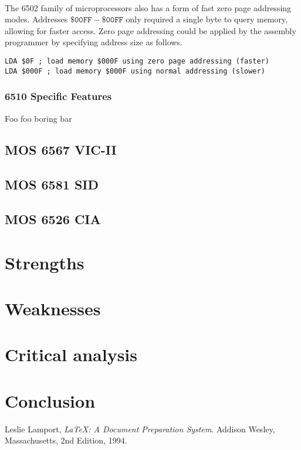 \documentclass{article}
\begin{document}
\paragraph{}
The 6502 family of microprocessors also has a form of fast zero page addressing modes. Addresses $\mathtt{\$00FF - \$00FF}$ only required a single byte to query memory, allowing for faster access. Zero page addressing could be applied by the assembly programmer by specifying address size as follows.
\begin{lstlisting}
LDA $0F ; load memory $000F using zero page addressing (faster)
LDA $000F ; load memory $000F using normal addressing (slower)
\end{lstlisting}

\subsubsection{6510 Specific Features}
Foo foo boring bar

\subsection{MOS 6567 VIC-II}

\subsection{MOS 6581 SID}

\subsection{MOS 6526 CIA}

\section{Strengths}

\section{Weaknesses}

\section{Critical analysis}

\section{Conclusion}

\pagebreak

\begin{thebibliography}{9}

  Leslie Lamport,
  \emph{\LaTeX: A Document Preparation System}.
  Addison Wesley, Massachusetts,
  2nd Edition,
  1994.

\end{thebibliography}
\end{document}
